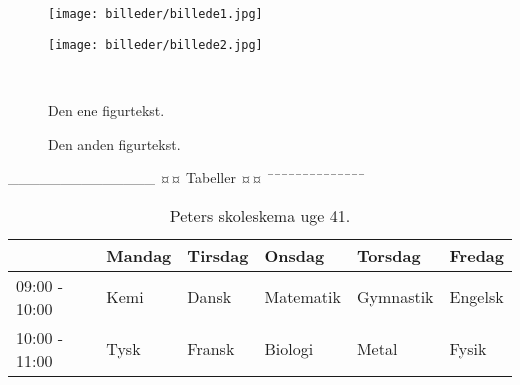 \begin{figure}[H]
	\centering
	\begin{minipage}[b]{0.48\textwidth}
	\centering
	\texttt{[image: billeder/billede1.jpg]} %
	\end{minipage}
	\hfill
	\begin{minipage}[b]{0.48\textwidth}
	\centering
	\texttt{[image: billeder/billede2.jpg]} %
	\end{minipage}
	\\ %
	\begin{minipage}[t]{0.48\textwidth}
	\caption{Den ene figurtekst.} %
	\label{fig:billede1}
	\end{minipage}
	\hfill
	\begin{minipage}[t]{0.48\textwidth}
	\caption{Den anden figurtekst.} %
	\label{fig:billede2}
	\end{minipage}
\end{figure}




______________
¤¤ Tabeller ¤¤
¯¯¯¯¯¯¯¯¯¯¯¯¯¯

\begin{table}[H] 
	\centering 
	\begin{tabular}{|l|l|l|l|l|l|} %
		\hline 	%
					  & Mandag & Tirsdag & Onsdag    & Torsdag   & Fredag  \\ \hline 	%
		09:00 - 10:00 & Kemi   & Dansk   & Matematik & Gymnastik & Engelsk \\ \hline 
		10:00 - 11:00 & Tysk   & Fransk  & Biologi   & Metal     & Fysik   \\ \hline 
	\end{tabular} 
	\caption{Peters skoleskema uge 41.} 
	\label{tab:skoleskema} 
\end{table}

